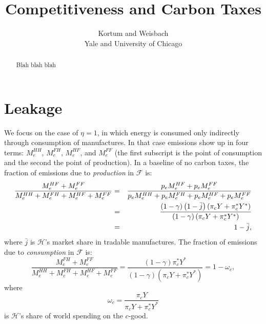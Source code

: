 \documentclass[notitlepage,12pt]{article}
\begin{document}
\title{Competitiveness and Carbon Taxes}
\author{Kortum and Weisbach \\
Yale and University of Chicago}
\maketitle

\begin{abstract}
Blah blah blah
\end{abstract}

\section{Leakage}

We focus on the case of $\eta =1$, in which energy is consumed only
indirectly through consumption of manufactures. In that case emissions show
up in four terms: $M_{e}^{HH}$, $M_{e}^{FH}$, $M_{e}^{HF}$, and $M_{e}^{FF}$
(the first subscript is the point of consumption and the second the point of
production). In a baseline of no carbon taxes, the fraction of emissions due
to \emph{production} in $\mathcal{F}$ is:%
\begin{eqnarray*}
\frac{M_{e}^{HF}+M_{e}^{FF}}{M_{e}^{HH}+M_{e}^{FH}+M_{e}^{HF}+M_{e}^{FF}} &=&%
\frac{p_{e}M_{e}^{HF}+p_{e}M_{e}^{FF}}{%
p_{e}M_{e}^{HH}+p_{e}M_{e}^{FH}+p_{e}M_{e}^{HF}+p_{e}M_{e}^{FF}} \\
&=&\frac{\left( 1-\gamma \right) \left( 1-\bar{j}\right) \left( \pi
_{c}Y+\pi _{c}^{\ast }Y^{\ast }\right) }{\left( 1-\gamma \right) \left( \pi
_{c}Y+\pi _{c}^{\ast }Y^{\ast }\right) } \\
&=&1-\bar{j},
\end{eqnarray*}%
where $\bar{j}$ is $\mathcal{H}$'s market share in tradable manufactures.
The fraction of emissions due to \emph{consumption} in $\mathcal{F}$ is:%
\begin{equation*}
\frac{M_{e}^{FH}+M_{e}^{FF}}{M_{e}^{HH}+M_{e}^{FH}+M_{e}^{HF}+M_{e}^{FF}}=%
\frac{\left( 1-\gamma \right) \pi _{c}^{\ast }Y^{\ast }}{\left( 1-\gamma
\right) \left( \pi _{c}Y+\pi _{c}^{\ast }Y^{\ast }\right) }=1-\omega _{c},
\end{equation*}%
where%
\begin{equation*}
\omega _{c}=\frac{\pi _{c}Y}{\pi _{c}Y+\pi _{c}^{\ast }Y^{\ast }}
\end{equation*}%
is $\mathcal{H}$'s share of world spending on the $c$-good.
\end{document}
